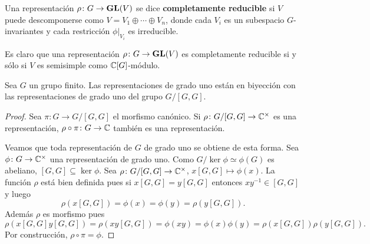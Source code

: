 \begin{definition}
Una representación $\rho\colon G\to\mathbf{GL}(V)$ se dice \textbf{completamente reducible} si
$V$ puede descomponerse como $V=V_1\oplus\cdots\oplus V_n$, donde cada $V_i$
es un subespacio $G$-invariantes y cada restricción $\phi|_{V_i}$ es irreducible.
\end{definition}

Es claro que una representación $\rho\colon G\to\mathbf{GL}(V)$ es completamente reducible
si y sólo si $V$ es semisimple como $\mathbb{C}[G]$-módulo. 



\begin{proposition}
  \label{proposition:Lin(G)}
  Sea $G$ un grupo finito. Las representaciones de grado uno están en biyección
  con las representaciones de grado uno del grupo $G/[G,G]$.
\end{proposition}

\begin{proof}
  Sea $\pi\colon G\to G/[G,G]$ el morfismo canónico. 
  Si $\rho\colon G/[G,G]\to\mathbb{C}^{\times}$ es una representación, 
  $\rho\circ\pi\colon G\to\mathbb{C}$ también es una representación. 
  
  Veamos que toda representación de $G$ de grado uno se obtiene de esta forma.
  Sea $\phi\colon G\to\mathbb{C}^\times$ una representación de grado uno. Como
  $G/\ker\phi\simeq\phi(G)$ es abeliano, $[G,G]\subseteq\ker\phi$. Sea
  $\rho\colon G/[G,G]\to\mathbb{C}^\times$, $x[G,G]\mapsto\phi(x)$. La función $\rho$
  está bien definida pues si $x[G,G]=y[G,G]$ entonces $xy^{-1}\in [G,G]$ y
  luego 
  \[
    \rho(x[G,G])=\phi(x)=\phi(y)=\rho(y[G,G]). 
  \]
  Además $\rho$ es morfismo pues
  \[
	\rho(x[G,G]y[G,G])
	=\rho(xy[G,G])=\phi(xy)
	=\phi(x)\phi(y)=\rho(x[G,G])\rho(y[G,G]).
  \]
  Por construcción, $\rho\circ\pi=\phi$.
\end{proof}

